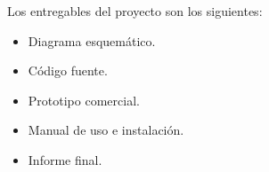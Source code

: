 Los entregables del proyecto son los siguientes:
\begin{itemize}
	\item Diagrama esquemático.
	\item Código fuente.
	\item Prototipo comercial.
	\item Manual de uso e instalación.
	\item Informe final.
\end{itemize}

